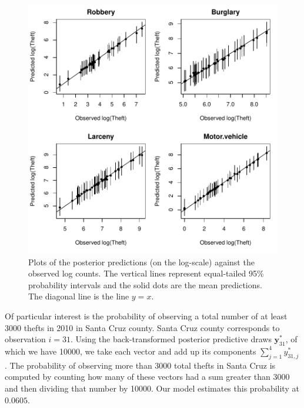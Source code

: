 \documentclass{asaproc}
\newcommand{\m}[1]{\mathbf{\bm{#1}}}
\begin{document}
\begin{figure}[ht]
\centering
\includegraphics[scale=0.55]{figs/fit.pdf}
\caption{Plots of the posterior predictions (on the log-scale) against the observed log counts. The vertical lines represent equal-tailed 95\% probability intervals and the solid dots are the mean predictions. The diagonal line is the line $y=x$.}
\label{fit}
\end{figure}

Of particular interest is the probability of observing a total number of at least 3000 thefts in 2010 in Santa Cruz county. Santa Cruz county corresponds to observation $i=31$. Using the back-transformed posterior predictive draws $\m{y}_{31}^*$, of which we have 10000, we take each vector and add up its components $\sum_{j=1}^4 y_{31,j}^*$. The probability of observing more than 3000 total thefts in Santa Cruz is computed by counting how many of these vectors had a sum greater than 3000 and then dividing that number by 10000. Our model estimates this probability at $0.0605$.
\end{document}
